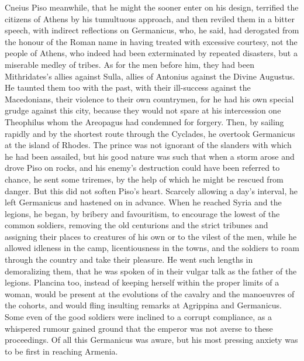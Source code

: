 
Cneius Piso meanwhile, that he might the sooner enter on his design, terrified the citizens of Athens by his tumultuous approach, and then reviled them in a bitter speech, with indirect reflections on Germanicus, who, he said, had derogated from the honour of the Roman name in having treated with excessive courtesy, not the people of Athens, who indeed had been exterminated by repeated disasters, but a miserable medley of tribes. As for the men before him, they had been Mithridates's allies against Sulla, allies of Antonius against the Divine Augustus. He taunted them too with the past, with their ill-success against the Macedonians, their violence to their own countrymen, for he had his own special grudge against this city, because they would not spare at his intercession one Theophilus whom the Areopagus had condemned for forgery. Then, by sailing rapidly and by the shortest route through the Cyclades, he overtook Germanicus at the island of Rhodes. The prince was not ignorant of the slanders with which he had been assailed, but his good nature was such that when a storm arose and drove Piso on rocks, and his enemy's destruction could have been referred to chance, he sent some triremes, by the help of which he might be rescued from danger. But this did not soften Piso's heart. Scarcely allowing a day's interval, he left Germanicus and hastened on in advance. When he reached Syria and the legions, he began, by bribery and favouritism, to encourage the lowest of the common soldiers, removing the old centurions and the strict tribunes and assigning their places to creatures of his own or to the vilest of the men, while he allowed idleness in the camp, licentiousness in the towns, and the soldiers to roam through the country and take their pleasure. He went such lengths in demoralizing them, that he was spoken of in their vulgar talk as the father of the legions. Plancina too, instead of keeping herself within the proper limits of a woman, would be present at the evolutions of the cavalry and the manoeuvres of the cohorts, and would fling insulting remarks at Agrippina and Germanicus. Some even of the good soldiers were inclined to a corrupt compliance, as a whispered rumour gained ground that the emperor was not averse to these proceedings. Of all this Germanicus was aware, but his most pressing anxiety was to be first in reaching Armenia.


